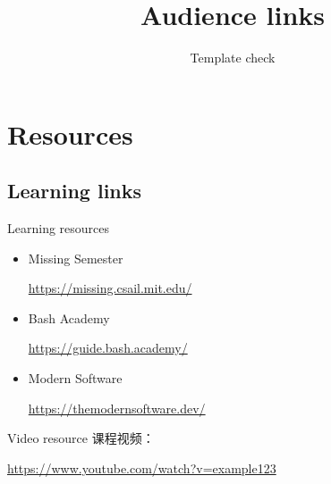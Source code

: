 \documentclass[language=english,cjk=true]{campusbeamer}
\title{Audience links}
\author{Template check}
\begin{document}
\section{Resources}
\subsection{Learning links}
\begin{frame}{Learning resources}
\begin{itemize}
  \item Missing Semester\par\url{https://missing.csail.mit.edu/}
  \item Bash Academy\par\url{https://guide.bash.academy/}
  \item Modern Software\par\url{https://themodernsoftware.dev/}
\end{itemize}
\end{frame}
\begin{frame}{Video resource}
\small
课程视频：\par
\url{https://www.youtube.com/watch?v=example123}
\end{frame}
\end{document}
